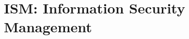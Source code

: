 


\newcommand{\INSTITUTE}{institute for networked solutions}
\newcommand{\SUBJECT}{Zusammenfassung}
\newcommand{\TITLE}{Informationssicherheit 1}
\newcommand{\AUTHORONE}{Julian Klaiber}
\newcommand{\AUTHORTWO}{Severin Dellsperger}



\tableofcontents



\section{ISM: Information Security Management}
